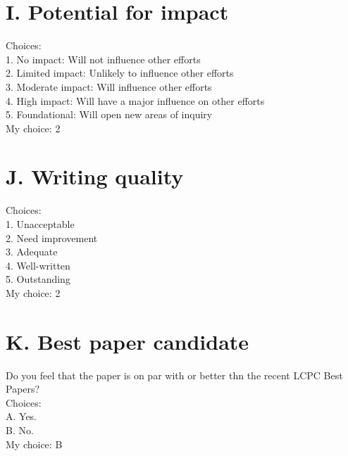 \documentclass[]{ctexart}
\begin{document}
    \section{I. Potential for impact}
    \noindent Choices:\\
    \hspace*{2em}1. No impact: Will not influence other efforts\\
    \hspace*{2em}2. Limited impact: Unlikely to influence other efforts\\
    \hspace*{2em}3. Moderate impact: Will influence other efforts\\
    \hspace*{2em}4. High impact: Will have a major influence on other efforts\\
    \hspace*{2em}5. Foundational: Will open new areas of inquiry\\
    My choice: 2
    \section{J. Writing quality}
    \noindent Choices:\\
    \hspace*{2em}1. Unacceptable\\
    \hspace*{2em}2. Need improvement\\
    \hspace*{2em}3. Adequate\\
    \hspace*{2em}4. Well-written\\
    \hspace*{2em}5. Outstanding\\
    My choice: 2
    \section{K. Best paper candidate}
    \noindent Do you feel that the paper is on par with or better thn the recent LCPC 
    Best Papers?\\
    Choices:\\
    \hspace*{2em}A. Yes.\\
    \hspace*{2em}B. No.\\
    My choice: B
\end{document}
